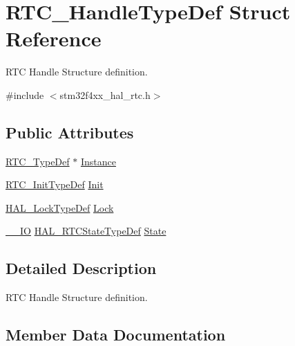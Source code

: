 \hypertarget{struct_r_t_c___handle_type_def}{}\section{R\+T\+C\+\_\+\+Handle\+Type\+Def Struct Reference}
\label{struct_r_t_c___handle_type_def}


R\+TC Handle Structure definition.  




{\ttfamily \#include $<$stm32f4xx\+\_\+hal\+\_\+rtc.\+h$>$}

\subsection*{Public Attributes}
\begin{DoxyCompactItemize}
\item 
\hyperlink{struct_r_t_c___type_def}{R\+T\+C\+\_\+\+Type\+Def} $\ast$ \hyperlink{struct_r_t_c___handle_type_def_a6a7bc50c975a169d24ba0a174f260abc}{Instance}
\item 
\hyperlink{struct_r_t_c___init_type_def}{R\+T\+C\+\_\+\+Init\+Type\+Def} \hyperlink{struct_r_t_c___handle_type_def_ad8d1ab770e21b2ff3da405115c5933a7}{Init}
\item 
\hyperlink{stm32f4xx__hal__def_8h_ab367482e943333a1299294eadaad284b}{H\+A\+L\+\_\+\+Lock\+Type\+Def} \hyperlink{struct_r_t_c___handle_type_def_ae72730d37db2c70485236bb9ff400592}{Lock}
\item 
\hyperlink{core__sc300_8h_aec43007d9998a0a0e01faede4133d6be}{\+\_\+\+\_\+\+IO} \hyperlink{group___r_t_c___exported___types_ga1e2460a2d13c4efc7a2a1ab2a1ebd32b}{H\+A\+L\+\_\+\+R\+T\+C\+State\+Type\+Def} \hyperlink{struct_r_t_c___handle_type_def_ae6f4d8c6cf47f2bd0823d5b570e44774}{State}
\end{DoxyCompactItemize}


\subsection{Detailed Description}
R\+TC Handle Structure definition. 

\subsection{Member Data Documentation}
